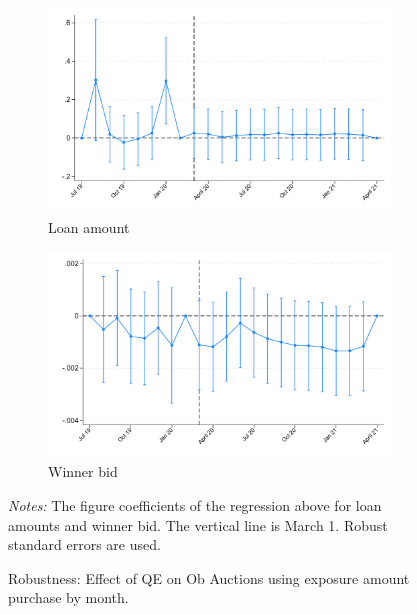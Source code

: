 \documentclass[11pt,a4paper]{article}
\begin{document}
\begin{figure}[h]
    \centering
    \begin{subfigure}[b]{0.49\textwidth}
        \includegraphics[width=0.998\textwidth]{../results/figures/did_loan_amount_expamount.pdf}
        \caption{ Loan amount }\label{fig:loan_amount}
       \end{subfigure}
       \begin{subfigure}[b]{0.49\textwidth}
        \includegraphics[width=0.998\textwidth]{../results/figures/did_winner_bid_expamount.pdf}
        \caption{ Winner bid }\label{fig:winner_bid}
       \end{subfigure}
       \caption{Robustness: Effect of QE on Ob Auctions using exposure amount purchase by month. }\label{fig:did_exp_amount}
     \begin{minipage}{\textwidth}
        \footnotesize{\textit{Notes:}  The figure coefficients of the regression above for loan amounts and winner bid. The vertical line is March 1.  Robust standard errors are used. }
        \end{minipage}
  \end{figure}
  
\end{document}
